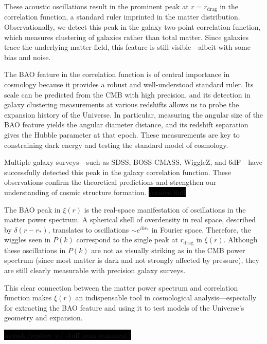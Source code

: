 \documentclass{aa}
\numberwithin{equation}{section}
\numberwithin{table}{section}
\numberwithin{figure}{section}
\begin{document}
These acoustic oscillations result in the prominent peak at $r = r_\text{drag}$ in the correlation function, a standard ruler imprinted in the matter distribution. Observationally, we detect this peak in the galaxy two-point correlation function, which measures clustering of galaxies rather than total matter. Since galaxies trace the underlying matter field, this feature is still visible—albeit with some bias and noise.

The BAO feature in the correlation function is of central importance in cosmology because it provides a robust and well-understood standard ruler. Its scale can be predicted from the CMB with high precision, and its detection in galaxy clustering measurements at various redshifts allows us to probe the expansion history of the Universe. In particular, measuring the angular size of the BAO feature yields the angular diameter distance, and its redshift separation gives the Hubble parameter at that epoch. These measurements are key to constraining dark energy and testing the standard model of cosmology.

Multiple galaxy surveys—such as SDSS, BOSS-CMASS, WiggleZ, and 6dF—have successfully detected this peak in the galaxy correlation function. These observations confirm the theoretical predictions and strengthen our understanding of cosmic structure formation. \colorbox{black}{remove fluff}

The BAO peak in $\xi(r)$ is the real-space manifestation of oscillations in the matter power spectrum. A spherical shell of overdensity in real space, described by $\delta(r - r_*)$, translates to oscillations $\sim e^{ikr_*}$ in Fourier space. Therefore, the wiggles seen in $P(k)$ correspond to the single peak at $r_\text{drag}$ in $\xi(r)$. Although these oscillations in $P(k)$ are not as visually striking as in the CMB power spectrum (since most matter is dark and not strongly affected by pressure), they are still clearly measurable with precision galaxy surveys.

This clear connection between the matter power spectrum and correlation function makes $\xi(r)$ an indispensable tool in cosmological analysis—especially for extracting the BAO feature and using it to test models of the Universe's geometry and expansion.

\colorbox{black}{include/replace w/ stuff from comment?}
\color{black}

\end{document}
